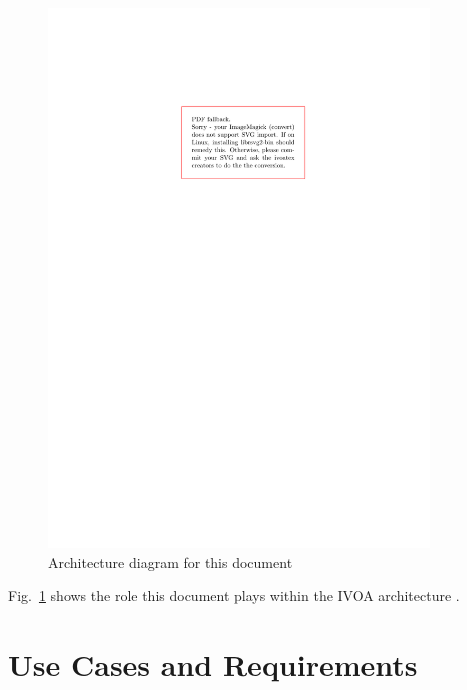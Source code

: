 \documentclass[11pt,a4paper]{ivoa}
\begin{document}
\begin{figure}
\centering


\includegraphics[width=0.9\textwidth]{role_diagram.pdf}
\caption{Architecture diagram for this document}
\label{fig:archdiag}
\end{figure}

Fig.~\ref{fig:archdiag} shows the role this document plays within the
IVOA architecture \citep{note:VOARCH}.



\section{Use Cases and  Requirements}
\end{document}
